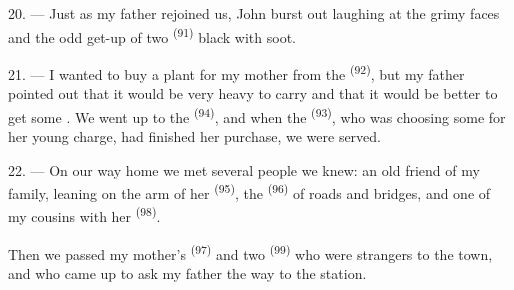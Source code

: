 20. --- Just as my father rejoined us, John burst out laughing at the grimy faces and the odd
get-up of two  \textsuperscript{(91)} black with soot.

21. --- I wanted to buy a plant for my mother from the 
\textsuperscript{(92)}, but my father pointed out that it would be very heavy to carry and
that it would be better to get some . We went up to the 
\textsuperscript{(94)}, and when the  \textsuperscript{(93)}, who was
choosing some for her young charge, had finished her purchase, we were served.

22. --- On our way home we met several people we knew: an old friend of my family, leaning on
the arm of her  \textsuperscript{(95)}, the
 \textsuperscript{(96)} of roads and bridges, and one of my cousins
with her  \textsuperscript{(98)}.

Then we passed my mother's  \textsuperscript{(97)} and two
 \textsuperscript{(99)} who were strangers to the town, and who came up to
ask my father the way to the station.
\VUsaut{6.0mm}
\VUfilet{22mm}
